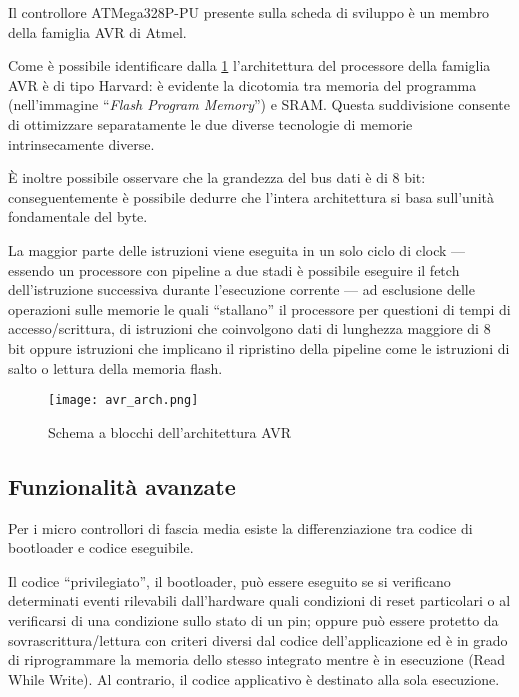 Il controllore ATMega328P-PU presente sulla scheda di sviluppo è un membro della famiglia AVR di Atmel\cite[1]{avr:m328p}.

Come è possibile identificare dalla \cref{fig:avr-arch} l'architettura del processore della famiglia AVR è di tipo Harvard: è evidente la dicotomia tra memoria del programma (nell'immagine ``\textit{Flash Program Memory}'') e SRAM\cite{harvard-arch}. Questa suddivisione consente di ottimizzare separatamente le due diverse tecnologie di memorie intrinsecamente diverse.

È inoltre possibile osservare che la grandezza del bus dati è di 8 bit: conseguentemente è possibile dedurre che l'intera architettura si basa sull'unità fondamentale del byte.

La maggior parte delle istruzioni viene eseguita in un solo ciclo di clock\cite[sec 7.6]{avr:m328p} --- essendo un processore con pipeline a due stadi è possibile eseguire il fetch dell'istruzione successiva durante l'esecuzione corrente --- ad esclusione delle operazioni sulle memorie le quali ``stallano'' il processore per questioni di tempi di accesso/scrittura, di istruzioni che coinvolgono dati di lunghezza maggiore di 8 bit oppure istruzioni che implicano il ripristino della pipeline come le istruzioni di salto o lettura della memoria flash.

\begin{figure}[t]
    \centering
    \texttt{[image: avr\_arch.png]}
    \caption[Immagine ottenuta dal documento~\cite{avr:m328p} fig 7-1]{Schema a blocchi dell'architettura AVR\cite[fig 7-1]{avr:m328p}}\label{fig:avr-arch}
\end{figure}

\subsection{Funzionalità avanzate}\label{ss:advanced-features}

Per i micro controllori di fascia media esiste la differenziazione tra codice di bootloader e codice eseguibile.

Il codice ``privilegiato'', il bootloader, può essere eseguito se si verificano determinati eventi rilevabili dall'hardware quali condizioni di reset particolari o al verificarsi di una condizione sullo stato di un pin; oppure può essere protetto da sovrascrittura/lettura con criteri diversi dal codice dell'applicazione ed è in grado di riprogrammare la memoria dello stesso integrato mentre è in esecuzione (Read While Write)\cite[sec 27.4]{avr:m328p}. Al contrario, il codice applicativo è destinato alla sola esecuzione.

